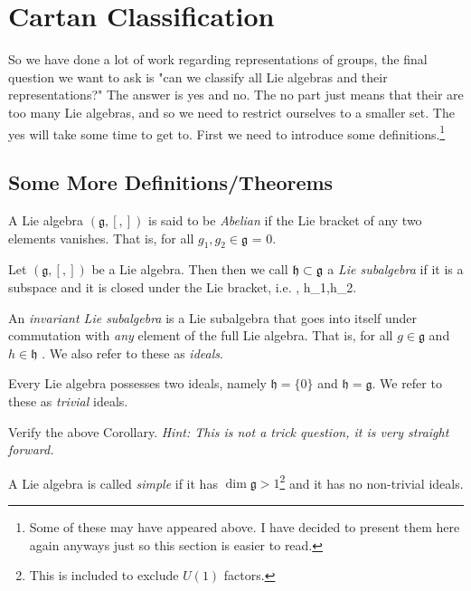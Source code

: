 \section{Cartan Classification}

So we have done a lot of work regarding representations of groups, the final question we want to ask is "can we classify all Lie algebras and their representations?" The answer is yes and no. The no part just means that their are too many Lie algebras, and so we need to restrict ourselves to a smaller set. The yes will take some time to get to. First we need to introduce some definitions.\footnote{Some of these may have appeared above. I have decided to present them here again anyways just so this section is easier to read.}

\subsection{Some More Definitions/Theorems}

    A Lie algebra $(\mathfrak{g},[,])$ is said to be \textit{Abelian} if the Lie bracket of any two elements vanishes. That is, for all $g_1,g_2\in\mathfrak{g}$
    \bse 
        [g_1,g_2] = 0.
    \ese 
\ed 

    Let $(\mathfrak{g},[,])$ be a Lie algebra. Then then we call $\mathfrak{h}\ss \mathfrak{g}$ a \textit{Lie subalgebra} if it is a subspace and it is closed under the Lie bracket, i.e. 
    \bse 
        [h_1,h_2] \in {}, \qquad \forall h_1,h_2\in{}.
    \ese
\ed

    An \textit{invariant Lie subalgebra} is a Lie subalgebra that goes into itself under commutation with \textit{any} element of the full Lie algebra. That is, for all $g\in \mathfrak{g}$ and $h\in\mathfrak{h}$
    \bse 
        [h,g] \in {}.
    \ese
    We also refer to these as \textit{ideals}.
\ed 

\bc 
    Every Lie algebra possesses two ideals, namely $\mathfrak{h}=\{0\}$ and $\mathfrak{h}=\mathfrak{g}$. We refer to these as \textit{trivial} ideals. 
\ec

\bbox 
    Verify the above Corollary. \textit{Hint: This is not a trick question, it is very straight forward.}
\ebox 

    A Lie algebra is called \textit{simple} if it has $\dim\mathfrak{g}>1$\footnote{This is included to exclude $U(1)$ factors.} and it has no non-trivial ideals. 
\ed 

